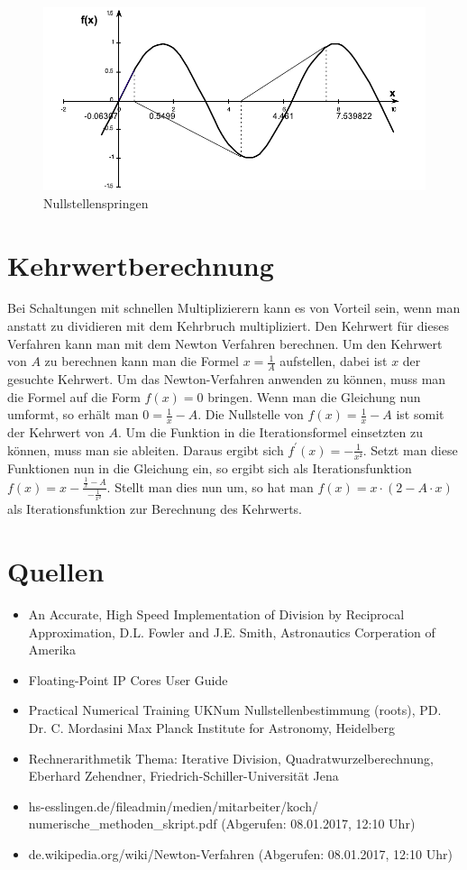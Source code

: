 \documentclass[a4paper,12pt,fleqn,oneside]{article}
\begin{document}
		\begin{figure}
			\centering
			\includegraphics[width=0.5\linewidth]{hupfen.png}
			\caption{Nullstellenspringen}
			\label{fig:hupfen}
		\end{figure}

\newpage

\section{Kehrwertberechnung}

	Bei Schaltungen mit schnellen Multiplizierern kann es von Vorteil sein, wenn man anstatt zu dividieren mit dem Kehrbruch multipliziert. Den Kehrwert
	für dieses Verfahren kann man mit dem Newton Verfahren berechnen. Um den Kehrwert von $A$ zu berechnen kann man die Formel $x = \frac{1}{A}$
	aufstellen, dabei ist $x$ der gesuchte Kehrwert. Um das Newton-Verfahren anwenden zu können, muss man die Formel auf die Form $f(x) = 0$ bringen.
	Wenn man die Gleichung nun umformt, so erhält man $0 = \frac{1}{x} - A$. Die Nullstelle von $f(x) = \frac{1}{x} - A$ ist somit der Kehrwert von $A$.
	Um die Funktion in die Iterationsformel einsetzten zu können, muss man sie ableiten. Daraus ergibt sich $f^\prime(x) = -\frac{1}{x²}$. Setzt man diese
	Funktionen nun in die Gleichung ein, so ergibt sich als Iterationsfunktion \\$f(x) = x- \frac{\frac{1}{x} - A}{-\frac{1}{x²}}$. Stellt man dies nun um, so hat
	man $f(x) = x \cdot (2 - A \cdot x)$ als Iterationsfunktion zur Berechnung des Kehrwerts.

\newpage

\section{Quellen}
	\begin{itemize}
		\item An Accurate, High Speed Implementation of Division by Reciprocal Approximation, D.L. Fowler and J.E. Smith, Astronautics Corperation of
			Amerika
		\item Floating-Point IP Cores User Guide
		\item Practical Numerical Training UKNum Nullstellenbestimmung (roots), PD. Dr. C. Mordasini Max Planck Institute for Astronomy, Heidelberg
		\item Rechnerarithmetik Thema: Iterative Division, Quadratwurzelberechnung, Eberhard Zehendner, Friedrich-Schiller-Universität Jena
		\item hs-esslingen.de/fileadmin/medien/mitarbeiter/koch/\\numerische\_methoden\_skript.pdf (Abgerufen: 08.01.2017, 12:10 Uhr)
		\item de.wikipedia.org/wiki/Newton-Verfahren (Abgerufen: 08.01.2017, 12:10 Uhr)
	\end{itemize}
\end{document}
